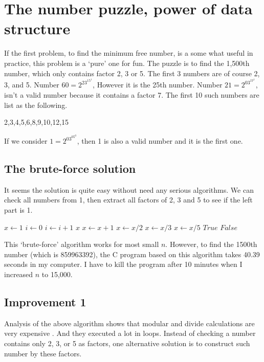 \documentclass[UTF8]{article}
\begin{document}
\section{The number puzzle, power of data structure}

If the first problem, to find the minimum free number, is a some what
useful in practice, this problem is a `pure' one for fun. The puzzle
is to find the 1,500th number, which only contains factor 2, 3 or 5.
The first 3 numbers are of course 2, 3, and 5. Number $60 = 2^23^15^1$,
However it is the 25th number. Number $21 = 2^03^17^1$, isn't a valid
number because it contains a factor 7. The first 10 such numbers are list
as the following.

2,3,4,5,6,8,9,10,12,15

If we consider $1=2^03^05^0$, then 1 is also a valid number and it is
the first one.

\subsection{The brute-force solution}
It seems the solution is quite easy without need any serious algorithms.
We can check all numbers from 1, then extract all factors of 2, 3 and 5
to see if the left part is 1.

\begin{algorithmic}[1]
  \State $x \gets 1$
  \State $i \gets 0$
  \Loop
      \State $i \gets i + 1$
        \State \Return $x$
      \EndIf
    \EndIf
    \State $x \gets x + 1$
  \EndLoop
\EndFunction
\Statex
{}
    \State $x \gets x / 2$
  \EndWhile
    \State $x \gets x / 3$
  \EndWhile
    \State $x \gets x / 5$
  \EndWhile
    \State \Return $True$
  \Else
    \State \Return $False$
  \EndIf
\EndFunction
\end{algorithmic}

This `brute-force' algorithm works for most small $n$. However, to find
the 1500th number (which is 859963392), the C program based on this
algorithm takes 40.39 seconds in my computer. I have to kill the program
after 10 minutes when I increased $n$ to 15,000.

\subsection{Improvement 1}
Analysis of the above algorithm shows that modular and divide calculations
are very expensive \cite{Bentley}. And they executed a lot in loops.
Instead of checking a number contains only 2, 3, or 5 as factors, one
alternative solution is to construct such number by these factors.
\end{document}
